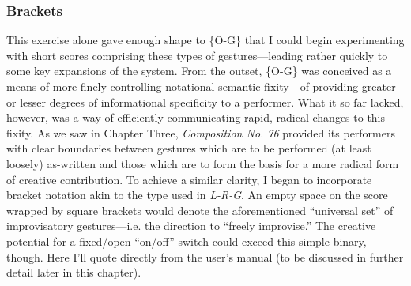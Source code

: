     \subsubsection{Brackets}
    This exercise alone gave enough shape to \{O-G\} that I could begin experimenting with short scores comprising these types of gestures---leading rather quickly to some key expansions of the system. From the outset, \{O-G\} was conceived as a means of more finely controlling notational semantic fixity---of providing greater or lesser degrees of informational specificity to a performer. What it so far lacked, however, was a way of efficiently communicating rapid, radical changes to this fixity. As we saw in Chapter Three, \textit{Composition No. 76} provided its performers with clear boundaries between gestures which are to be performed (at least loosely) as-written and those which are to form the basis for a more radical form of creative contribution. To achieve a similar clarity, I began to incorporate bracket notation akin to the type used in \textit{L-R-G}. An empty space on the score wrapped by square brackets would denote the aforementioned ``universal set'' of improvisatory gestures---i.e. the direction to ``freely improvise.'' The creative potential for a fixed/open ``on/off'' switch could exceed this simple binary, though. Here I'll quote directly from the user's manual (to be discussed in further detail later in this chapter).

